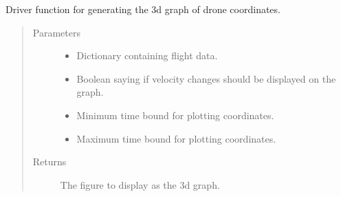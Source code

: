 \documentclass[letterpaper,10pt,english]{sphinxmanual}
\begin{document}

\begin{fulllineitems}
\label{\detokenize{index:src.Views.Graph.generateGraph}}
Driver function for generating the 3d graph of drone coordinates.
\begin{quote}\begin{description}
\item[{Parameters}] \leavevmode\begin{itemize}
\item {} 
 \textendash{} Dictionary containing flight data.

\item {} 
 \textendash{} Boolean saying if velocity changes should be displayed on the graph.

\item {} 
 \textendash{} Minimum time bound for plotting coordinates.

\item {} 
 \textendash{} Maximum time bound for plotting coordinates.

\end{itemize}

\item[{Returns}] \leavevmode
The figure to display as the 3d graph.

\end{description}\end{quote}

\end{fulllineitems}

\end{document}
